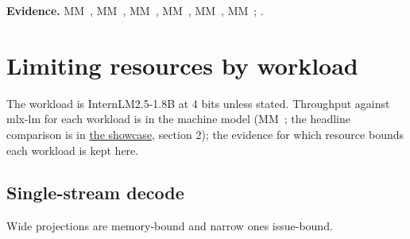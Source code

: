 \textbf{Evidence.} MM~, MM~, MM~, MM~, MM~, MM~; .

\section{Limiting resources by workload}\label{sec:bounds-real-workloads}

The workload is InternLM2.5-1.8B at 4 bits unless stated. Throughput against mlx-lm for each workload is in the
machine model (MM~; the headline comparison is in \href{https://github.com/sbryngelson/AGXForge/blob/main/docs/showcase.md}{the showcase}, section 2); the evidence for which resource bounds
each workload is kept here.

\subsection*{Single-stream decode}

Wide projections are memory-bound and narrow ones issue-bound.


